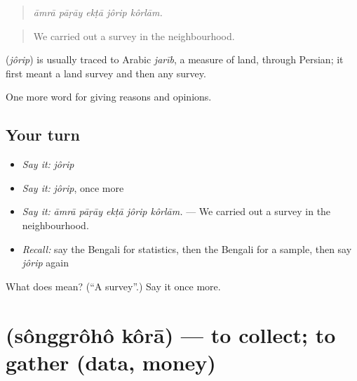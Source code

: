 \begin{quote}
    
\end{quote}

\begin{quote}
\emph{āmrā pāṛāy ekṭā jôrip kôrlām.}
\end{quote}

\begin{quote}
We carried out a survey in the neighbourhood.
\end{quote}

\begin{cousinweb}
\textbf{} (\emph{jôrip}) is usually traced to Arabic \emph{jarīb}, a measure of land, through Persian; it first meant a land survey and then any survey.
\end{cousinweb}

\begin{grammarlens}[title={What you've built}]
One more word for giving reasons and opinions.
\end{grammarlens}

\subsection*{Your turn}
\begin{itemize}
\raggedright
  \item \emph{Say it:} \emph{jôrip}
  \item \emph{Say it:} \emph{jôrip}, once more
  \item \emph{Say it:} \emph{āmrā pāṛāy ekṭā jôrip kôrlām.} — We carried out a survey in the neighbourhood.
  \item \emph{Recall:} say the Bengali for statistics, then the Bengali for a sample, then say \emph{jôrip} again
\end{itemize}

\begin{tcolorbox}[breakable,colback=teal!4,colframe=teal!35!black,title={Before you move on}]
What does  mean? (\textquotedblleft{}A survey\textquotedblright{}.) Say it once more.
\end{tcolorbox}
\section[\texorpdfstring{\bn{সংগ্রহ} \bn{করা} (sônggrôhô kôrā)}{সংগ্রহ করা (sônggrôhô kôrā)}]{  (sônggrôhô kôrā) — to collect; to gather (data, money)}

\label{lesson:BN-C355-songgroho-kora}



